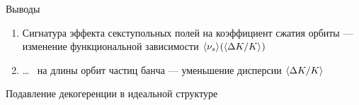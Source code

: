 \documentclass[14pt]{beamer}
\begin{document}
\begin{frame}{Выводы}
	\begin{enumerate}
		\item Сигнатура эффекта секступольных полей на коэффициент сжатия орбиты --- изменение функциональной зависимости $\avg{\nu_s}(\avg{\Delta K/K})$
		\item \ldots~ на длины орбит частиц банча --- уменьшение дисперсии $\avg{\Delta K/K}$
	\end{enumerate}
\end{frame}
\begin{frame}{Подавление декогеренции в идеальной структуре}\centering
\end{frame}
\end{document}
